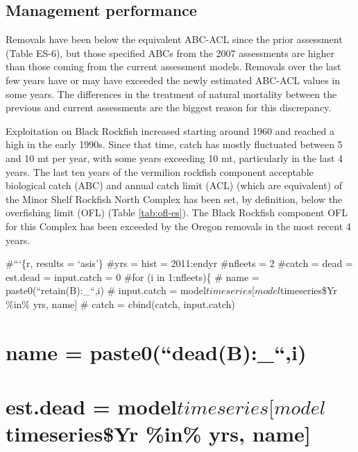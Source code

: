 \documentclass[11pt,
  english,
  letterpaper,
]{article}
\begin{document}


\clearpage

\hypertarget{management-performance}{%
\subsection*{Management performance}\label{management-performance}}

Removals have been below the equivalent ABC-ACL since the prior assessment (Table ES-6), but those specified ABCs from the 2007 assessments are higher than those coming from the current assessment models. Removals over the last few years have or may have exceeded the newly estimated ABC-ACL values in some years. The differences in the treatment of natural mortality between the previous and current assessments are the biggest reason for this discrepancy.

Exploitation on Black Rockfish increased starting around 1960 and reached a high in the early 1990s. Since that time, catch has mostly fluctuated between 5 and 10 mt per year, with some years exceeding 10 mt, particularly in the last 4 years. The last ten years of the vermilion rockfish component acceptable biological catch (ABC) and annual catch limit (ACL) (which are equivalent) of the Minor Shelf Rockfish North Complex has been set, by definition, below the overfishing limit (OFL) (Table \ref{tab:ofl-es}). The Black Rockfish component OFL for this Complex has been exceeded by the Oregon removals in the most recent 4 years.

\#```\{r, results = `asis'\} \#yrs = hist = 2011:endyr \#nfleets = 2 \#catch = dead = est.dead = input.catch = 0 \#for (i in 1:nfleets)\{ \# name = paste0(``retain(B):\_``,i) \# input.catch = model\(timeseries[model\)timeseries\$Yr \%in\% yrs, name{]} \# catch = cbind(catch, input.catch)

\hypertarget{name-paste0deadb_i}{%
\section{name = paste0(``dead(B):\_``,i)}\label{name-paste0deadb_i}}

\hypertarget{est.dead-modeltimeseriesmodeltimeseriesyr-in-yrs-name}{%
\section{\texorpdfstring{est.dead = model\(timeseries[model\)timeseries\$Yr \%in\% yrs, name{]}}{est.dead = modeltimeseries{[}modeltimeseries\$Yr \%in\% yrs, name{]}}}\label{est.dead-modeltimeseriesmodeltimeseriesyr-in-yrs-name}}
\end{document}

